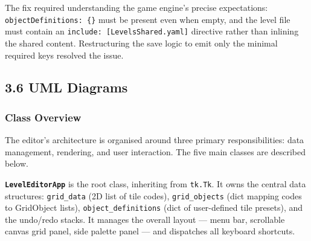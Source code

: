 The fix required understanding the game engine's precise expectations:
\texttt{objectDefinitions:\ \{\}} must be present even when empty, and
the level file must contain an
\texttt{include:\ {[}LevelsShared.yaml{]}} directive rather than
inlining the shared content. Restructuring the save logic to emit only
the minimal required keys resolved the issue.

\subsection{3.6 UML Diagrams}\label{uml-diagrams}

\subsubsection{Class Overview}\label{class-overview}

The editor's architecture is organised around three primary
responsibilities: data management, rendering, and user interaction. The
five main classes are described below.

\textbf{\texttt{LevelEditorApp}} is the root class, inheriting from
\texttt{tk.Tk}. It owns the central data structures: \texttt{grid\_data}
(2D list of tile codes), \texttt{grid\_objects} (dict mapping codes to
GridObject lists), \texttt{object\_definitions} (dict of user-defined
tile presets), and the undo/redo stacks. It manages the overall layout
--- menu bar, scrollable canvas grid panel, side palette panel --- and
dispatches all keyboard shortcuts.

\begin{Shaded}
\begin{Highlighting}[]
\NormalTok{\}}
\end{Highlighting}
\end{Shaded}

